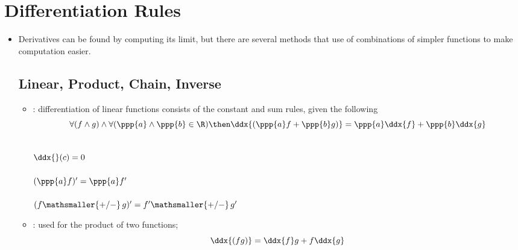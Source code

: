 \section{Differentiation Rules}
  \begin{itemize}
    \item Derivatives can be found by computing its limit, but there are several methods that use of combinations of simpler functions to make computation easier.

  \subsection{Linear, Product, Chain, Inverse}
  \begin{itemize}
    \item {}: differentiation of linear functions consists of the constant and sum  rules, given the following
    \[%
    \forall (f \land g) \land \forall(\ppp{a} \land \ppp{b} \in \R) \then
    \ddx{(\ppp{a}f+\ppp{b}g)} = \ppp{a}\ddx{f} + \ppp{b}\ddx{g}
    \]%
    \begin{multicols}{3}
       \\ \(\ddx{}(c) = 0\) \\
      \\ \((\ppp{a}f)' = \ppp{a}f'\) \\
      \\ \((f \mathsmaller{+/-}\, g)' = f' \mathsmaller{+/-}\, g'\) \\
    \end{multicols}

    \item {}: used for the product of two functions; \hyperref[ss: General Leibniz Rule]{}
    \[%
    \ddx{(fg)} = \ddx{f}g + f\ddx{g}
    \]%
    

\end{itemize}
\end{itemize}

